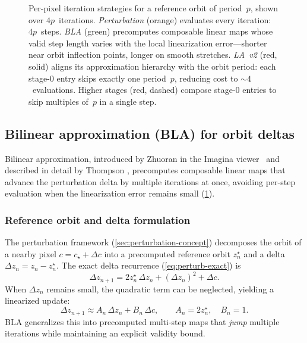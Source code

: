 \begin{figure}[!htbp]
{%
}%
\caption[Iteration skipping: perturbation vs.\ BLA vs.\ LA]{%
  \sloppy
  Per-pixel iteration strategies for a reference orbit of period~$p$,
  shown over $4p$~iterations.
  \emph{Perturbation} (orange) evaluates every iteration: $4p$~steps.
  \emph{BLA} (green) precomputes composable linear maps whose valid
  step length varies with the local linearization error---shorter
  near orbit inflection points, longer on smooth stretches.
  \emph{LA~v2} (red, solid) aligns its approximation hierarchy with
  the orbit period: each stage-0 entry skips exactly one
  period~$p$, reducing cost to ${\sim}4$~evaluations.  Higher
  stages (red, dashed) compose stage-0 entries to skip multiples
  of~$p$ in a single step.}
\label{fig:approx-skipping}
\end{figure}

\subsection{Bilinear approximation (BLA) for orbit deltas}
\label{sec:bilinear-approx}

Bilinear approximation, introduced by Zhuoran in the Imagina
viewer~\cite{Imagina} and described in detail by
Thompson \cite{Thompson2023BLA}, precomputes composable linear
maps that advance the perturbation delta by multiple iterations at once,
avoiding per-step evaluation when the linearization error remains small
(\cref{fig:approx-skipping}).

\subsubsection{Reference orbit and delta formulation}
The perturbation framework (\cref{sec:perturbation-concept}) decomposes
the orbit of a nearby pixel \(c = c_\star + \Delta c\) into a
precomputed reference orbit \(z_n^\star\) and a delta
\(\Delta z_n = z_n - z_n^\star\).  The exact delta recurrence
(\cref{eq:perturb-exact}) is
\[
\Delta z_{n+1} = 2z_n^\star\,\Delta z_n + (\Delta z_n)^2 + \Delta c.
\]
When \(\Delta z_n\) remains small, the quadratic term can be neglected,
yielding a linearized update:
\begin{equation}
\Delta z_{n+1} \approx A_n\,\Delta z_n + B_n\,\Delta c,\qquad
A_n = 2z_n^\star,\quad B_n = 1.
\end{equation}
BLA generalizes this into precomputed multi-step maps that \emph{jump} multiple
iterations while maintaining an explicit validity bound.

